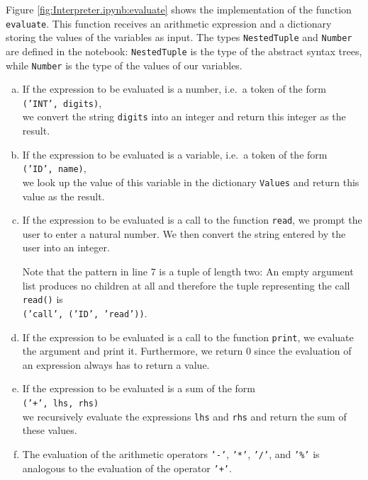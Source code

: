 Figure \ref{fig:Interpreter.ipynb:evaluate} shows the implementation of the function \texttt{evaluate}.
This function receives an arithmetic expression and a dictionary storing the
values of the variables as input.  The types \texttt{NestedTuple} and \texttt{Number} are defined in the
notebook:  \texttt{NestedTuple} is the type of the abstract syntax trees, while \texttt{Number} is the type of
the values of our variables.
\begin{enumerate}[(a)]
\item If the expression to be evaluated is a number, i.e.~a token of the form
      \\[0.2cm]
      \hspace*{1.3cm}
      \texttt{('INT', digits)},
      \\[0.2cm]
      we convert the string \texttt{digits} into an integer and return this integer as the result.
\item If the expression to be evaluated is a variable, i.e.~a token of the form
      \\[0.2cm]
      \hspace*{1.3cm}
      \texttt{('ID', name)},
      \\[0.2cm]
      we look up the value of this variable in the dictionary \texttt{Values} and return this value as the
      result.
\item If the expression to be evaluated is a call to the function \texttt{read},
      we prompt the user to enter a natural number.  We then convert the string entered by the user into an integer.

      Note that the pattern in line 7 is a tuple of length two:  An empty argument list produces no
      children at all and therefore the tuple representing the call \texttt{read()} is
      \\[0.2cm]
      \hspace*{1.3cm}
      \texttt{('call', ('ID', 'read'))}.
\item If the expression to be evaluated is a call to the function \texttt{print}, we evaluate the argument and
      print it.  Furthermore, we return 0 since the evaluation of an expression always has to return a value.
\item If the expression to be evaluated is a sum of the form
      \\[0.2cm]
      \hspace*{1.3cm}
      \texttt{('+', lhs, rhs)}
      \\[0.2cm]
      we recursively evaluate the expressions \texttt{lhs} and \texttt{rhs} and return the sum of these
      values. 
\item The evaluation of the arithmetic operators \texttt{'-'}, \texttt{'*'}, \texttt{'/'}, and \texttt{'\%'}
      is analogous to the evaluation of the operator \texttt{'+'}.
\end{enumerate}
\FloatBarrier

